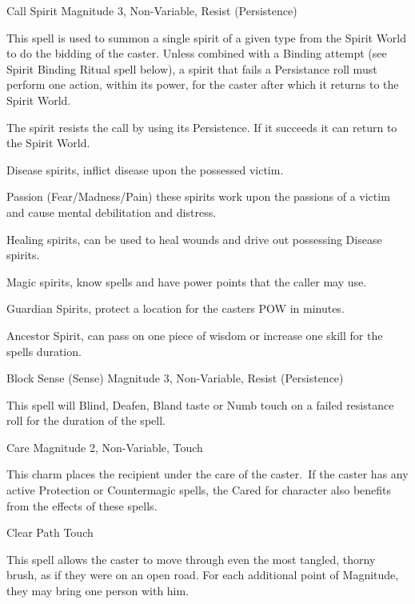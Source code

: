 \begin{rpg-spell}
{Call Spirit}
{Magnitude 3, Non-Variable, Resist (Persistence)}

This spell is used to summon a single spirit of a given type from the Spirit World to do the bidding of the caster. Unless combined with a Binding attempt (see Spirit Binding Ritual spell below), a spirit that fails a Persistance roll must perform one action, within its power, for the caster after which it returns to the Spirit World.

The spirit resists the call by using its Persistence. If it succeeds it can return to the Spirit World. 

\begin{rpg-list}
\item Disease spirits, inflict disease upon the possessed victim.
\item Passion (Fear/Madness/Pain) these spirits work upon the passions of a victim and cause mental debilitation and distress.
\item Healing spirits, can be used to heal wounds and drive out possessing Disease spirits.
\item Magic spirits, know spells and have power points that the caller may use.
\item Guardian Spirits, protect a location for the casters POW in minutes.
\item Ancestor Spirit, can pass on one piece of wisdom or increase one skill for the spells duration.
\end{rpg-list}
\end{rpg-spell}

 
\begin{rpg-spell}
{Block Sense (Sense)}
{Magnitude 3, Non-Variable, Resist (Persistence)}

This spell will Blind, Deafen, Bland taste or Numb touch on a failed resistance roll for the duration of the spell.
\end{rpg-spell}


\begin{rpg-spell}
{Care}
{Magnitude 2, Non-Variable, Touch}

This charm places the recipient under the care of the caster. If the caster has any active Protection or Countermagic spells, the Cared for character also benefits from the effects of these spells.
\end{rpg-spell}

\begin{rpg-spell}
{Clear Path}
{Touch}

This spell allows the caster to move through even the most tangled, thorny brush, as if they were on an open road. For each additional point of Magnitude, they may bring one person with him. 
\end{rpg-spell}


